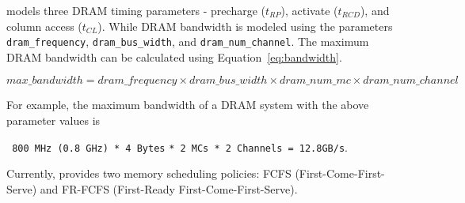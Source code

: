\noindent \SIM models three DRAM timing parameters - precharge ($t_{RP}$), activate
($t_{RCD}$), and column access ($t_{CL}$). While DRAM bandwidth is modeled using the
parameters \Verb+dram_frequency+, \Verb+dram_bus_width+, and
\Verb+dram_num_channel+. The maximum DRAM bandwidth can be calculated using
Equation~\ref{eq:bandwidth}. 

\begin{equation}
\label{eq:bandwidth}
max\_bandwidth = dram\_frequency \times dram\_bus\_width \times dram\_num\_mc \times dram\_num\_channel 
\end{equation}

\noindent For example, the maximum bandwidth of a DRAM system with the above parameter
values is

\Verb+ 800 MHz (0.8 GHz) * 4 Bytes+
\Verb+* 2 MCs * 2 Channels = 12.8GB/s+.
 

\noindent Currently, \SIM provides two memory scheduling policies: FCFS 
(First-Come-First-Serve) and FR-FCFS (First-Ready First-Come-First-Serve).











